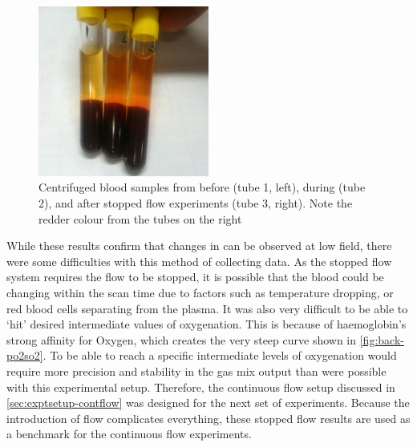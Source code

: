 \begin{figure}[t]
\centering
\includegraphics[width=0.5\textwidth]{figures/stoppedflow/samplecheck.jpg}
\caption[Centrifuged blood samples from start and end of experiment]{Centrifuged blood samples from before (tube 1, left), during (tube 2), and after stopped flow experiments (tube 3, right). Note the redder colour from the tubes on the right}
\label{fig:sf-bloodbeforeafter}
\end{figure}

While these results confirm that changes in \SOtwo can be observed at low field, there were some difficulties with this method of collecting data.
As the stopped flow system requires the flow to be stopped, it is possible that the blood could be changing within the scan time due to factors such as temperature dropping, or red blood cells separating from the plasma.
It was also very difficult to be able to `hit' desired intermediate values of oxygenation.
This is because of haemoglobin's strong affinity for Oxygen, which creates the very steep curve shown in \autoref{fig:back-po2so2}.
To be able to reach a specific intermediate levels of oxygenation would require more precision and stability in the gas mix output than were possible with this experimental setup.
Therefore, the continuous flow setup discussed in \autoref{sec:exptsetup-contflow} was designed for the next set of experiments.
Because the introduction of flow complicates everything, these stopped flow results are used as a benchmark for the continuous flow experiments.
